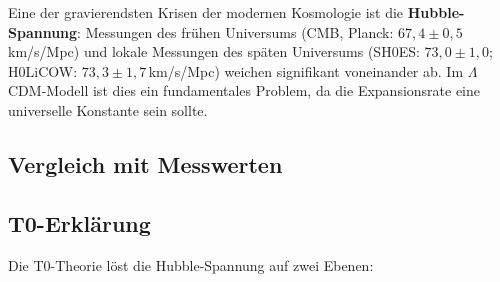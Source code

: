 	Eine der gravierendsten Krisen der modernen Kosmologie ist die \textbf{Hubble-Spannung}: Messungen des frühen Universums (CMB, Planck: $67{,}4 \pm 0{,}5\,$km/s/Mpc) und lokale Messungen des späten Universums (SH0ES: $73{,}0 \pm 1{,}0$; H0LiCOW: $73{,}3 \pm 1{,}7\,$km/s/Mpc) weichen signifikant voneinander ab. Im $\Lambda$CDM-Modell ist dies ein fundamentales Problem, da die Expansionsrate eine universelle Konstante sein sollte.
	
	\subsection{Vergleich mit Messwerten}
	
	\begin{center}
	\end{center}
	
	\subsection{T0-Erklärung}
	
	Die T0-Theorie löst die Hubble-Spannung auf zwei Ebenen:
	
